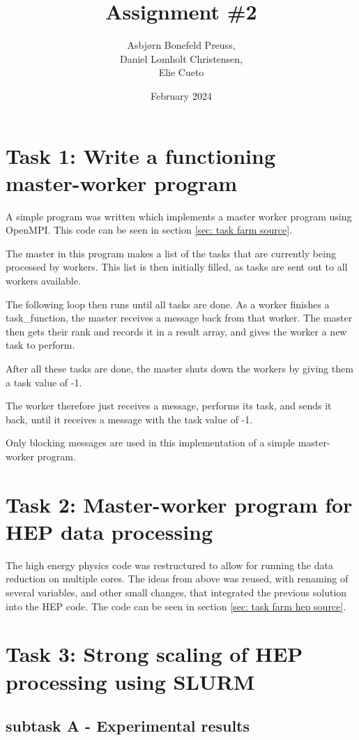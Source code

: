 \documentclass{article}
\title{Assignment \#2}
\author{Asbjørn Bonefeld Preuss,\\ Daniel Lomholt Christensen,\\ Elie Cueto}
\date{February 2024}
\begin{document}
\maketitle
\section{Task 1: Write a functioning master-worker program}
A simple program was written which implements a master worker program using OpenMPI. This code can be seen in section \ref{sec: task farm source}. 

The master in this program makes a list of the tasks that are currently being processed by workers. This list is then initially filled, as tasks are sent out to all workers available.

The following loop then runs until all tasks are done.
As a worker finishes a task\_function, the master receives a message back from that worker. The master then gets their rank and records it in a result array, and gives the worker a new task to perform.

After all these tasks are done, the master shuts down the workers by giving them a task value of -1.

The worker therefore just receives a message, performs its task, and sends it back, until it receives a message with the task value of -1.

Only blocking messages are used in this implementation of a simple master-worker program.

\section{Task 2: Master-worker program for HEP data processing} 
The high energy physics code was restructured to allow for running the data reduction on multiple cores. The ideas from above was reused, with renaming of several variables, and other small changes, that integrated the previous solution into the HEP code. The code can be seen in section \ref{sec: task farm hep source}.

\section{Task 3: Strong scaling of HEP processing using SLURM}
\subsection{subtask A - Experimental results}
\end{document}

